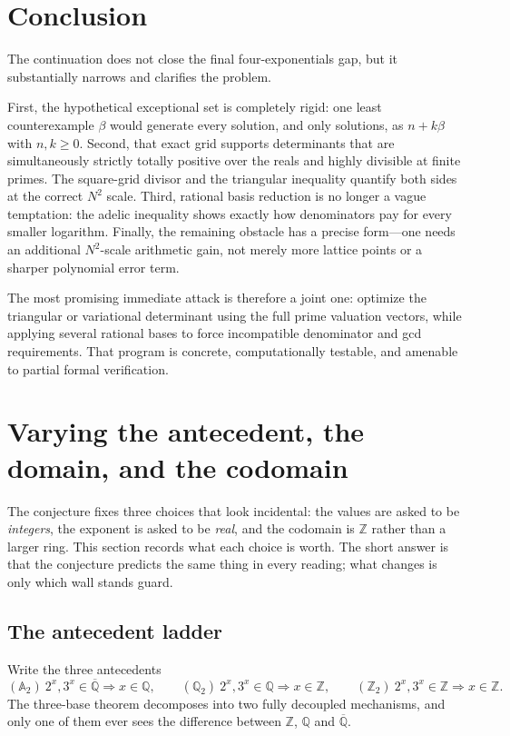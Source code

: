 \documentclass[11pt,oneside]{article}
\theoremstyle{definition}
\theoremstyle{remark}
\newcommand{\Z}{\mathbb Z}
\newcommand{\Q}{\mathbb Q}
\newcommand{\Abar}{\overline{\mathbb Q}}
\newcommand{\Qbar}{\Abar}
\begin{document}
\section{Conclusion}

The continuation does not close the final four-exponentials gap, but it
substantially narrows and clarifies the problem.

First, the hypothetical exceptional set is completely rigid: one least
counterexample $\beta$ would generate every solution, and only solutions, as
$n+k\beta$ with $n,k\ge0$.  Second, that exact grid supports determinants that
are simultaneously strictly totally positive over the reals and highly
divisible at finite primes.  The square-grid divisor and the triangular
inequality quantify both sides at the correct $N^2$ scale.  Third, rational
basis reduction is no longer a vague temptation: the adelic inequality shows
exactly how denominators pay for every smaller logarithm.  Finally, the
remaining obstacle has a precise form---one needs an additional $N^2$-scale
arithmetic gain, not merely more lattice points or a sharper polynomial error
term.

The most promising immediate attack is therefore a joint one: optimize the
triangular or variational determinant using the full prime valuation vectors,
while applying several rational bases to force incompatible denominator and
gcd requirements.  That program is concrete, computationally testable, and
amenable to partial formal verification.

\section{Varying the antecedent, the domain, and the codomain}
\label{sec:variants}

The conjecture fixes three choices that look incidental: the values are asked to be
\emph{integers}, the exponent is asked to be \emph{real}, and the codomain is $\Z$ rather than
a larger ring.  This section records what each choice is worth.  The short answer is that the
conjecture predicts the same thing in every reading; what changes is only which wall stands
guard.

\subsection{The antecedent ladder}

Write the three antecedents
\[
  (\mathbb A_2)\ 2^x,3^x\in\Qbar\Rightarrow x\in\Q,
  \qquad
  (\Q_2)\ 2^x,3^x\in\Q\Rightarrow x\in\Z,
  \qquad
  (\Z_2)\ 2^x,3^x\in\Z\Rightarrow x\in\Z .
\]
The three-base theorem decomposes into two fully decoupled mechanisms, and only one of them
ever sees the difference between $\Z$, $\Q$ and $\Qbar$.
\end{document}
